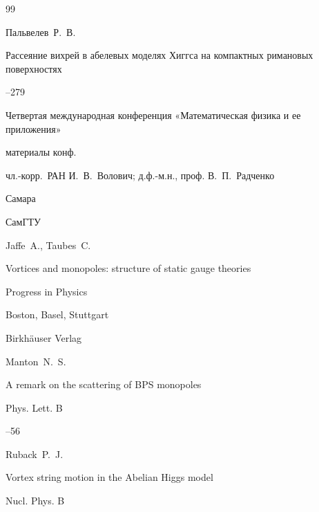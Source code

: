 \begin{thebibliography}{99}




\by  Пальвелев~Р.~В.

\paper Рассеяние вихрей в абелевых моделях Хиггса на компактных римановых поверхностях 

--279

\inbook Четвертая международная конференция «Математическая физика и ее приложения»

\bookinfo материалы конф. 

\eds чл.-корр.~РАН И.~В.~Волович; д.ф.-м.н., проф. В.~П.~Радченко

\publaddr Самара

\publ СамГТУ





\by Jaffe~A., Taubes~C.

\book Vortices and monopoles: structure of static gauge theories

\serial Progress in Physics


\publaddr Boston, Basel, Stuttgart

\publ Birkh\"auser Verlag










\by Manton~N.~S.  

\paper A remark on the scattering of BPS monopoles

\jour Phys. Lett. B 




--56







\by Ruback~P.~J. 

\paper Vortex string motion in the Abelian Higgs model 

\jour Nucl. Phys. B 


\end{thebibliography}
